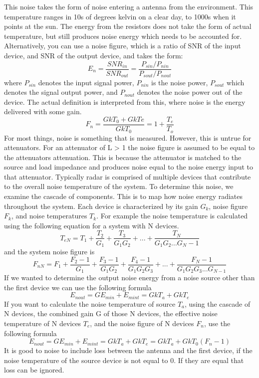 \documentclass[12pt]{article}
\begin{document}
This noise takes the form of noise entering a antenna from the environment. This temperature ranges in 10s of degrees kelvin on a clear day, to 1000s when it points at the sun. The energy from the resistors does not take the form of actual temperature, but still produces noise energy which needs to be accounted for. Alternatively, you can use a noise figure, which is a ratio of SNR of the input device, and SNR of the output device, and takes the form:
\begin{equation}
    E_n = \frac{SNR_{in}}{SNR_{out}} = \frac{P_{sin} / P_{nin}}{P_{sout}/ P_{nout}}
\end{equation}
where $P_{sin}$ denotes the input signal power, $P_{nin}$ is the noise power, $P_{sout}$ which denotes the signal output power, and $P_{nout}$ denotes the noise power out of the device. The actual definition is interpreted from this, where noise is the energy delivered with some gain.
\begin{equation}
    F_n = \frac{GkT_0 + GkTe}{GkT_0} = 1 + \frac{T_e}{T_o}
\end{equation}
For most things, noise is something that is measured. However, this is untrue for attenuators. For an attenuator of L > 1 the noise figure is assumed to be equal to the attenuators attenuation. This is because the attenuator is matched to the source and load impedance and produces noise equal to the noise energy input to that attenuator. 
Typically radar is comprised of multiple devices that contribute to the overall noise temperature of the system. To determine this noise, we examine the cascade of components. This is to map how noise energy radiates throughout the system. Each device is characterized by its gain $G_k$, noise figure $F_k$, and noise temperatures $T_k$.
For example the noise temperature is calculated using the following equation for a system with N devices.
\begin{equation}
    T_{eN} = T_1 + \frac{T_2}{G_1} + \frac{T_3}{G_1 G_2} +  ... + \frac{T_N}{G_1 G_2 ... G_N-1}
\end{equation}
and the system noise figure is 
\begin{equation}
    F_{nN} = F_1 + \frac{F_2 -1}{G_1} + \frac{F_3 -1}{G_1 G_2} + \frac{F_4 -1}{G_1 G_2 G_3} +  ... + \frac{F_N -1}{G_1 G_2 G_3 ... G_{N-1}}
\end{equation}
If we wanted to determine the output noise energy from a noise source other than the first device we can use the following formula
\begin{equation}
    E_{nout} = GE_{min} + E_{mint} = GkT_a + GkT_e
\end{equation}
If you want to calculate the noise temperature of source $T_a$, using the cascade of N devices, the combined gain G of those N devices, the effective noise temperature of N devices $T_e$, and the noise figure of N devices $F_n$, use the following formula
\begin{equation}
    E_{nout} = GE_{min} + E_{mint} = GkT_a + GkT_e = GkT_a + GkT_0 (F_n -1)
\end{equation}
It is good to noise to include loss between the antenna and the first device, if the noise temperature of the source device is not equal to 0. If they are equal that loss can be ignored. 
\end{document}
